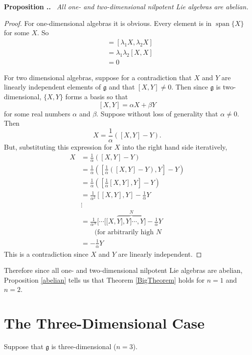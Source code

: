 \documentclass[honours]{UNSWthesis}
\newcommand{\g}{\mathfrak{g}}
\newcommand{\1}{\mathbf{e}_{1}}
\newcommand{\2}{\mathbf{e}_{3}}
\newcommand{\3}{\mathbf{e}_{3}}
\DeclareMathOperator{\spn}{span}
\newcounter{Item}[section]
\newenvironment{Proposition}{\medskip
                            \refstepcounter{Item}
                            \noindent
                           {\bf Proposition \thesection.\theItem.}\ %
                            \begingroup \sl}
                           {\endgroup\medskip}
\begin{document}
\begin{Proposition}
All one- and two-dimensional nilpotent Lie algebras are abelian.
\end{Proposition}

\begin{proof}
For one-dimensional algebras it is obvious. Every element is in $\spn\{X\}$ for some $X$. So 
\begin{align*}
[X_1,X_2] &= [\lambda_1 X, \lambda_2 X] \\
&= \lambda_1 \lambda_2 [X,X] \\
&= 0
\end{align*}

For two dimensional algebras, suppose for a contradiction that $X$ and $Y$ are linearly independent elements of $\g$ and that $[X,Y] \neq 0$. Then since $\g$ is two-dimensional, $\{X,Y\}$ forms a basis so that 
\[
[X,Y] = \alpha X+\beta Y
\]
for some real numbers $\alpha$ and $\beta$. Suppose without loss of generality that $\alpha \neq 0$. Then 
\[
X = \frac{1}{\alpha}([X,Y]-Y).
\]
But, substituting this expression for $X$ into the right hand side iteratively, 
\begin{align*}
X&= \frac{1}{\alpha}([X,Y]-Y) \\
&=  \frac{1}{\alpha}( [\frac{1}{\alpha}([X,Y]-Y), Y]-Y) \\
&= \frac{1}{\alpha}( [\frac{1}{\alpha}[X,Y], Y]-Y) \\ 
&= \frac{1}{\alpha^2} [[X,Y], Y]-\frac{1}{\alpha} Y \\ 
& \vdots \\
&= \frac{1}{\alpha^N}[\cdots[[X,\overbrace{Y],Y]\cdots ,Y]}^{N}-\frac{1}{\alpha} Y \\
& \quad \quad \text{(for arbitrarily high $N$} \\
&= -\frac{1}{\alpha} Y
\end{align*}
This is a contradiction since $X$ and $Y$ are linearly independent. 
 
\end{proof}

Therefore since all one- and  two-dimensional nilpotent Lie algebras are abelian, Proposition \ref{abelian} tells us that Theorem \ref{BigTheorem} holds for $n=1$ and $n=2$. 

\section{The Three-Dimensional Case}
Suppose that $\g$ is three-dimensional ($n=3$).
\end{document}
